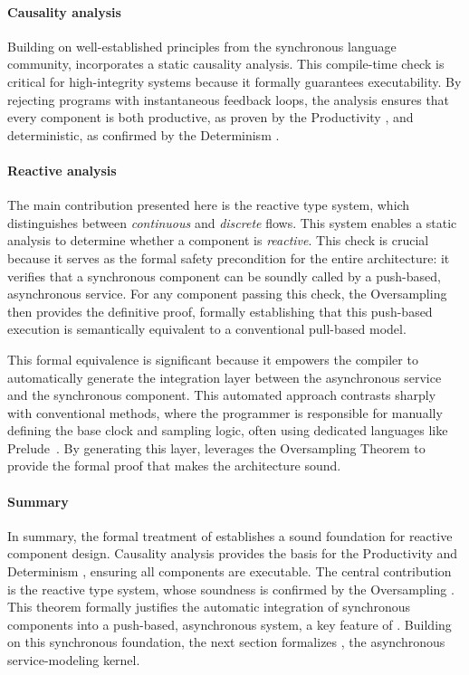 \paragraph{Causality analysis}
Building on well-established principles from the synchronous language community, \GRSync
incorporates a static causality analysis. This compile-time check is critical for high-integrity
systems because it formally guarantees executability. By rejecting programs with instantaneous
feedback loops, the analysis ensures that every component is both productive, as proven by the
Productivity , and deterministic, as
confirmed by the Determinism .

\paragraph{Reactive analysis}
The main contribution presented here is the reactive type system, which distinguishes between
\emph{continuous} and \emph{discrete} flows. This system enables a static analysis to determine
whether a component is \emph{reactive}. This check is crucial because it serves as the formal safety
precondition for the entire architecture: it verifies that a synchronous component can be soundly
called by a push-based, asynchronous service. For any component passing this check, the Oversampling
 then provides the definitive proof, formally
establishing that this push-based execution is semantically equivalent to a conventional pull-based
model.

This formal equivalence is significant because it empowers the compiler to automatically generate
the integration layer between the asynchronous service and the synchronous component. This automated
approach contrasts sharply with conventional methods, where the programmer is responsible for
manually defining the base clock and sampling logic, often using dedicated languages like
Prelude~\cite{DBLP:journals/deds/PagettiFBCL11}. By generating this layer, \GRust leverages the
Oversampling Theorem to provide the formal proof that makes the architecture sound.

\paragraph{Summary}
In summary, the formal treatment of \GRSync establishes a sound foundation for reactive component
design. Causality analysis provides the basis for the Productivity and Determinism
,
ensuring all components are executable. The central contribution is
the reactive type system, whose soundness is confirmed by the Oversampling
. This theorem formally justifies the automatic
integration of synchronous components into a push-based, asynchronous system, a key feature of
\GRust. Building on this synchronous foundation, the next section formalizes \GRFRP, the
asynchronous service-modeling kernel.
